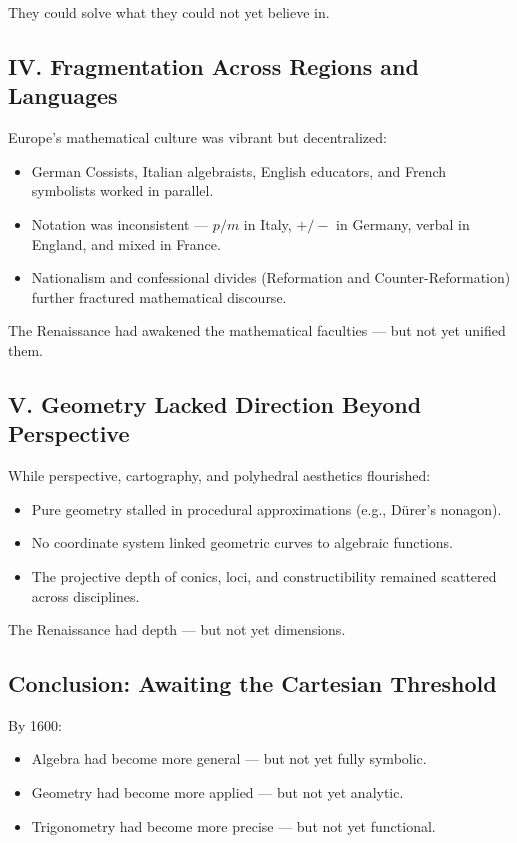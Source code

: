 \documentclass[9pt]{article}
\begin{document}
They could solve what they could not yet believe in.

\subsection*{IV. Fragmentation Across Regions and Languages}

Europe's mathematical culture was vibrant but decentralized:

\begin{itemize}
    \item German Cossists, Italian algebraists, English educators, and French symbolists worked in parallel.
    \item Notation was inconsistent — $p/m$ in Italy, $+/-$ in Germany, verbal in England, and mixed in France.
    \item Nationalism and confessional divides (Reformation and Counter-Reformation) further fractured mathematical discourse.
\end{itemize}

The Renaissance had awakened the mathematical faculties — but not yet unified them.

\subsection*{V. Geometry Lacked Direction Beyond Perspective}

While perspective, cartography, and polyhedral aesthetics flourished:

\begin{itemize}
    \item Pure geometry stalled in procedural approximations (e.g., Dürer’s nonagon).
    \item No coordinate system linked geometric curves to algebraic functions.
    \item The projective depth of conics, loci, and constructibility remained scattered across disciplines.
\end{itemize}

The Renaissance had depth — but not yet dimensions.

\subsection*{Conclusion: Awaiting the Cartesian Threshold}

By 1600:

\begin{itemize}
    \item Algebra had become more general — but not yet fully symbolic.
    \item Geometry had become more applied — but not yet analytic.
    \item Trigonometry had become more precise — but not yet functional.
\end{itemize}
\end{document}
